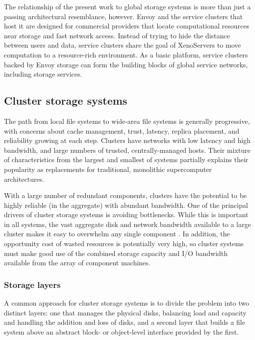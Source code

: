 The relationship of the present work to global storage systems is more than just a passing architectural resemblance, however. Envoy and the service clusters that host it are designed for commercial providers that locate computational resources near storage and fast network access. Instead of trying to hide the distance between users and data, service clusters share the goal of XenoServers \cite{reed} to move computation to a resource-rich environment. As a basic platform, service clusters backed by Envoy storage can form the building blocks of global service networks, including storage services.

\subsection{Cluster storage systems}\label{sec:cluster-storage-systems}

The path from local file systems to wide-area file systems is generally progressive, with concerns about cache management, trust, latency, replica placement, and reliability growing at each step. Clusters have networks with low latency and high bandwidth, and large numbers of trusted, centrally-managed hosts. Their mixture of characteristics from the largest and smallest of systems partially explains their popularity as replacements for traditional, monolithic supercomputer architectures.

With a large number of redundant components, clusters have the potential to be highly reliable (in the aggregate) with abundant bandwidth. One of the principal drivers of cluster storage systems is avoiding bottlenecks. While this is important in all systems, the vast aggregate disk and network bandwidth available to a large cluster makes it easy to overwhelm any single component \cite{hospodor}. In addition, the opportunity cost of wasted resources is potentially very high, so cluster systems must make good use of the combined storage capacity and I/O bandwidth available from the array of component machines.

\subsubsection{Storage layers}\label{sec:storage-layer-systems}

A common approach for cluster storage systems is to divide the problem into two distinct layers: one that manages the physical disks, balancing load and capacity and handling the addition and loss of disks, and a second layer that builds a file system above an abstract block- or object-level interface provided by the first.

